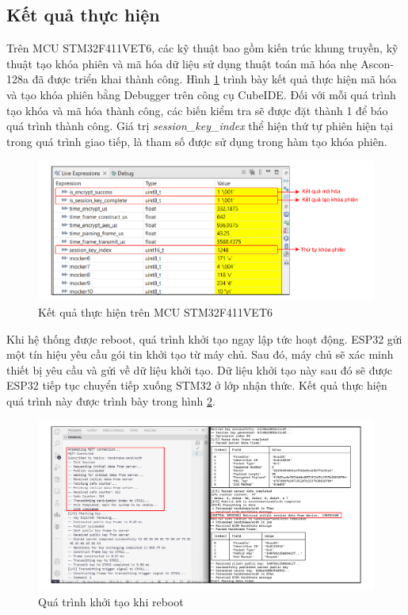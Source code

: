 \subsection{Kết quả thực hiện}
Trên MCU STM32F411VET6, các kỹ thuật bao gồm kiến trúc khung truyền, kỹ thuật tạo khóa phiên và mã hóa dữ liệu sử dụng thuật toán mã hóa nhẹ Ascon-128a đã được triển khai thành công. Hình \ref{fig:stm32log} trình bày kết quả thực hiện mã hóa và tạo khóa phiên bằng Debugger trên công cụ CubeIDE. Đối với mỗi quá trình tạo khóa và mã hóa thành công, các biến kiểm tra sẽ được đặt thành 1 để báo quá trình thành công. Giá trị \textit{session\_key\_index} thể hiện thứ tự phiên hiện tại trong quá trình giao tiếp, là tham số được sử dụng trong hàm tạo khóa phiên.
\begin{figure}[h]
    \centering
    \includegraphics[width=0.9\linewidth]{stm32log.pdf}
    \caption{Kết quả thực hiện trên MCU STM32F411VET6}
    \label{fig:stm32log}
\end{figure}

Khi hệ thống được reboot, quá trình khởi tạo ngay lập tức hoạt động. ESP32 gửi một tín hiệu yêu cầu gói tin khởi tạo từ máy chủ. Sau đó, máy chủ sẽ xác minh thiết bị yêu cầu và gửi về dữ liệu khởi tạo. Dữ liệu khởi tạo này sau đó sẽ được ESP32 tiếp tục chuyển tiếp xuống STM32 ở lớp nhận thức. Kết quả thực hiện quá trình này được trình bày trong hình \ref{fig:initlog}.

\begin{figure}[h]
    \centering
    \hspace*{-0.7cm}
    \includegraphics[width=1.08\linewidth]{initlog.pdf}
    \caption{Quá trình khởi tạo khi reboot}
    \label{fig:initlog}
\end{figure}

